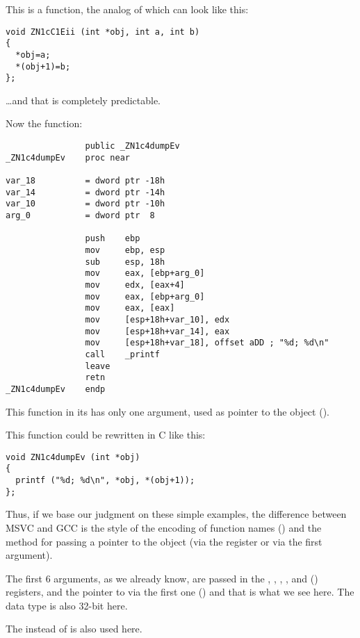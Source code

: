 This is a function, the analog of which can look like this:

\begin{lstlisting}
void ZN1cC1Eii (int *obj, int a, int b)
{
  *obj=a;
  *(obj+1)=b;
};
\end{lstlisting}

\dots and that is completely predictable.

Now the  function:

\begin{lstlisting}
                public _ZN1c4dumpEv
_ZN1c4dumpEv    proc near

var_18          = dword ptr -18h
var_14          = dword ptr -14h
var_10          = dword ptr -10h
arg_0           = dword ptr  8

                push    ebp
                mov     ebp, esp
                sub     esp, 18h
                mov     eax, [ebp+arg_0]
                mov     edx, [eax+4]
                mov     eax, [ebp+arg_0]
                mov     eax, [eax]
                mov     [esp+18h+var_10], edx
                mov     [esp+18h+var_14], eax
                mov     [esp+18h+var_18], offset aDD ; "%d; %d\n"
                call    _printf
                leave
                retn
_ZN1c4dumpEv    endp
\end{lstlisting}

This function in its  has only one argument, 
used as pointer to the object (\ITthis).

This function could be rewritten in C like this:

\begin{lstlisting}
void ZN1c4dumpEv (int *obj)
{
  printf ("%d; %d\n", *obj, *(obj+1));
};
\end{lstlisting}

Thus, if we base our judgment on these simple examples, the difference between MSVC and GCC
is the style of the encoding of function names () and the method for passing a pointer to the object
(via the \ECX register or via the first argument).


The first 6 arguments, as we already know, are passed in the \RDI, \RSI, \RDX, \RCX,  and 
 (\SysVABI) registers,
and the pointer to \ITthis via the first one (\RDI) and that is what we see here.
The \Tint data type is also 32-bit here.

The \JMP instead of \RET {} is also used here.



